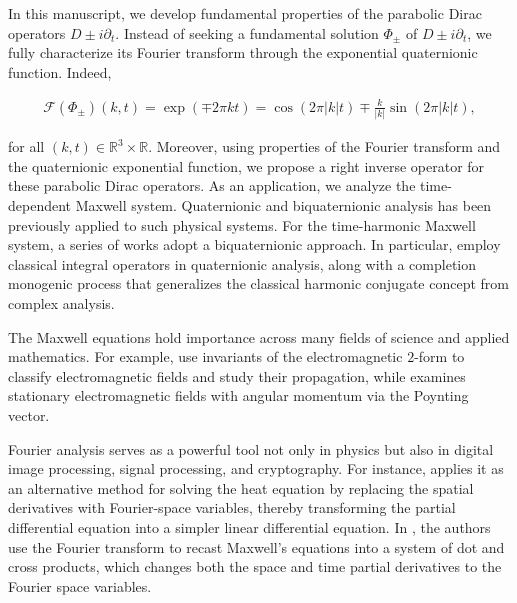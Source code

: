 \documentclass[12pt]{article}
\newcommand{\fourier}[1]{\mathcal{F}\left( #1 \right)}
\newcommand{\expo}[1]{\exp\left( #1\right)}
\begin{document}
In this manuscript, we develop fundamental properties of the parabolic Dirac operators $D\pm i \partial_t$. Instead of seeking a fundamental solution $\Phi_{\pm}$ of $D\pm i \partial_t$, we fully characterize its Fourier transform through the exponential quaternionic function. Indeed, 

\begin{align*}
    \fourier{\Phi_\pm}(k,t)=\expo{\mp 2\pi kt}=\cos\left(2\pi|k|t\right)\mp\frac{k}{|k|}\sin\left(2\pi|k|t\right),
\end{align*}

for all $(k,t)\in \mathbb{R}^3\times \mathbb{R}$. Moreover, using properties of the Fourier transform and the quaternionic exponential function, we propose a right inverse operator for these parabolic Dirac operators. As an application, we analyze the time-dependent Maxwell system. Quaternionic and biquaternionic analysis has been previously applied to such physical systems. For the time-harmonic Maxwell system, a series of works \cite{Kravchenko1992, DelKrav2019, delgado2023biquaternionic} adopt a biquaternionic approach. In particular, \cite{DelKrav2019, delgado2023biquaternionic} employ classical integral operators in quaternionic analysis, along with a completion monogenic process that generalizes the classical harmonic conjugate concept from complex analysis.

The Maxwell equations hold importance across many fields of science and applied mathematics. For example, \cite{mitskievich2008classification,mitskievich2006electromagnetic} use invariants of the electromagnetic $2$-form to classify electromagnetic fields and study their propagation, while \cite{vargas2020relativistic} examines stationary electromagnetic fields with angular momentum via the Poynting vector.

Fourier analysis serves as a powerful tool not only in physics but also in digital image processing, signal processing, and cryptography. For instance, \cite{danchin2005fourier} applies it as an alternative method for solving the heat equation by replacing the spatial derivatives with Fourier-space variables, thereby transforming the partial differential equation into a simpler linear differential equation. In \cite{andrade2023maxwell}, the authors use the Fourier transform to recast Maxwell's equations into a system of dot and cross products, which changes both the space and time partial derivatives to the Fourier space variables. 
\end{document}

